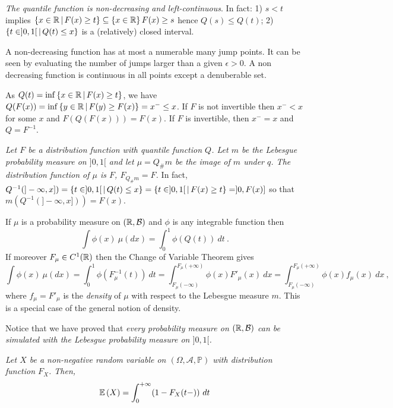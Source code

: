 \documentclass[12pt,a4paper]{amsart}
\theoremstyle{plain}%
\theoremstyle{definition}
\theoremstyle{remark}
\begin{document}
\emph{The quantile function is non-decreasing and left-continuous}. In fact: 1) $s < t$ implies $\left\{x\in\mathbb{R} \, \middle| \, F(x) \geq t \right\} \subseteq \left\{x\in\mathbb{R}\right\}{F(x) \geq s}$ hence $Q(s) \leq Q(t)$; 2) $\left\{t \in ]0,1[ \, \middle| \, Q(t) \leq x \right\}$ is a (relatively) closed interval.

A non-decreasing function has at most a numerable many jump points. It can be seen by evaluating the number of jumps larger than a given $\epsilon > 0$. A non decreasing function is continuous in all points except a denuberable set.

As $Q(t) = \inf\left\{x \in \mathbb{R} \, \middle| \, F(x) \geq t \right\}$, we have $Q(F(x)) = \inf\left\{y \in \mathbb{R} \, \middle| \, F(y) \geq F(x) \right\} = x^- \leq x$. If $F$ is not invertible then $x^- < x$ for some $x$ and $F(Q(F(x))) = F(x)$. If $F$ is invertible, then $x^-=x$ and $Q = F^{-1}$.

\emph{Let $F$ be a distribution function with quantile function $Q$. Let $m$ be the Lebesgue probability measure on $]0,1[$ and let $\mu = Q_{\#} m$ be the image of $m$ under $q$. The distribution function of $\mu$ is $F$, $F_{Q_{\#} m} = F$.} In fact, $Q^{-1}(]-\infty,x]) = \left\{t \in ]0,1[ \, \middle| \, Q(t) \leq x \right\} = \left\{t \in ]0,1[ \, \middle| \, F(x) \geq t \right\} = ]0,F(x)]$ so that $m(Q^{-1}(]-\infty,x])) = F(x)$.

If $\mu$ is a probability measure on $(\mathbb{R},\mathcal B)$ and $\phi$ is any integrable function then 
\begin{equation*}
  \int \phi(x) \ \mu(dx) = \int_0^1 \phi(Q(t)) \ dt \ .
\end{equation*}
If moreover $F_\mu \in C^1(\mathbb{R})$ then the Change of Variable Theorem gives
\begin{equation*}
  \int \phi(x) \ \mu(dx) = \int_0^1 \phi(F_\mu^{-1}(t)) \ dt = \int_{F_\mu(-\infty)}^{F_\mu(+\infty)} \phi(x) F'_{\mu}(x) \ dx = \int_{F_\mu(-\infty)}^{F_\mu(+\infty)} \phi(x)f_{\mu}(x) \ dx \ ,
\end{equation*}
where $f_\mu = F'_\mu$ is the \emph{density} of $\mu$ with respect to the Lebesgue measure $m$. This is a special case of the general notion of density.

Notice that we have proved that \emph{every probability measure on $(\mathbb{R},\mathcal B)$ can be \emph{simulated} with the Lebesgue probability measure on $]0,1[$.}

\emph{Let $X$ be a non-negative random variable on $(\Omega,\mathcal A,\mathbb P)$ with distribution function $F_X$. Then,
\begin{equation*}
  \operatorname{\mathbb E}\left(X\right) = \int_0^{+\infty} (1-F_X(t-)) \ dt
\end{equation*}}
\end{document}
